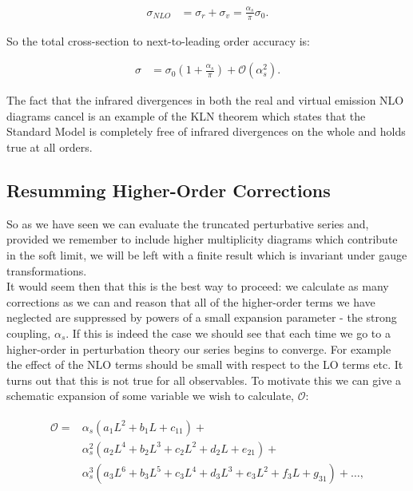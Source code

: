 			\begin{align}
				\sigma_{NLO} &= \sigma_r + \sigma_v = \frac{\alpha_s}{\pi}\sigma_0.
			\end{align}

			So the total cross-section to next-to-leading order accuracy is:

			\begin{align}
				\sigma &= \sigma_0\left(1 + \frac{\alpha_s}{\pi}\right) + \mathcal{O}(\alpha_s^2).
			\end{align}


			The fact that the infrared divergences in both the real and virtual emission NLO diagrams cancel is an example of the
			KLN theorem which states that the Standard Model is completely free of infrared divergences on the whole and holds
			true at all orders.

	\subsection{Resumming Higher-Order Corrections}

		So as we have seen we can evaluate the truncated perturbative series and, provided we remember to include higher
		multiplicity diagrams which contribute in the soft limit, we will be left with a finite result which is invariant
		under gauge transformations.\\ It would seem then that this is the best way to proceed: we calculate as many corrections
		as we can and reason that all of the higher-order terms we have neglected are suppressed by powers of a small expansion
		parameter - the strong coupling, $\alpha_s$.  If this is indeed the case we should see that each time we go to a higher-order
		in perturbation theory our series begins to converge.  For example the effect of the NLO terms should be small with respect
		to the LO terms etc.  It turns out that this is not true for all observables.  To motivate this we can give a schematic expansion
		of some variable we wish to calculate, $\mathcal{O}$:

		\begin{align}
		\begin{split}
			\mathcal{O} = &\alpha_s  \left(a_1L^2 + b_1L   + c_11\right) + \\
			              &\alpha_s^2\left(a_2L^4 + b_2L^3 + c_2L^2 + d_2L   + e_21\right) + \\
			              &\alpha_s^3\left(a_3L^6 + b_3L^5 + c_3L^4 + d_3L^3 + e_3L^2 + f_3L + g_31\right) + \ldots,
			\label{eqn:schematicExpn}
		\end{split}
		\end{align}

